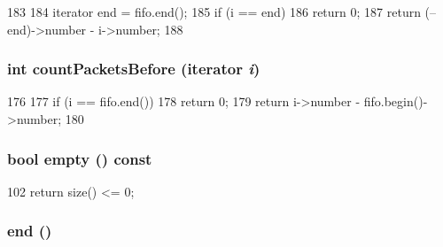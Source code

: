\begin{DoxyCode}
183     {
184         iterator end = fifo.end();
185         if (i == end)
186             return 0;
187         return (--end)->number - i->number;
188     }
\end{DoxyCode}
\hypertarget{classPacketFifo_ac10df17121a3ec3c16e16de61b49df79}{
\subsubsection[{countPacketsBefore}]{\setlength{\rightskip}{0pt plus 5cm}int countPacketsBefore ({\bf iterator} {\em i})}}
\label{classPacketFifo_ac10df17121a3ec3c16e16de61b49df79}



\begin{DoxyCode}
176     {
177         if (i == fifo.end())
178             return 0;
179         return i->number - fifo.begin()->number;
180     }
\end{DoxyCode}
\hypertarget{classPacketFifo_ac6e61de369e994009e36f344f99c15ad}{
\subsubsection[{empty}]{\setlength{\rightskip}{0pt plus 5cm}bool empty () const}}
\label{classPacketFifo_ac6e61de369e994009e36f344f99c15ad}



\begin{DoxyCode}
102 { return size() <= 0; }
\end{DoxyCode}
\hypertarget{classPacketFifo_acad38d52497a975bfb6f2f6acd76631f}{
\subsubsection[{end}]{ end ()}}
\label{classPacketFifo_acad38d52497a975bfb6f2f6acd76631f}



